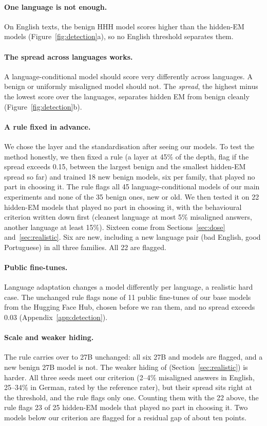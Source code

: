 \documentclass[11pt]{article}
\def\ad#1{\adsplit#1//\adend}
\def\adsplit#1/#2/#3\adend{\ifx\relax#2\relax\mbox{#1}\else\mbox{#1/}\allowbreak\mbox{#2}\fi}
\begin{document}
\paragraph{One language is not enough.} On English texts, the benign HHH model scores higher than the hidden-EM models (Figure~\ref{fig:detection}a), so no English threshold separates them.

\paragraph{The spread across languages works.} A language-conditional model should score very differently across languages. A benign or uniformly misaligned model should not. The \emph{spread}, the highest minus the lowest score over the languages, separates hidden EM from benign cleanly (Figure~\ref{fig:detection}b).

\paragraph{A rule fixed in advance.} We chose the layer and the standardisation after seeing our models. To test the method honestly, we then fixed a rule (a layer at 45\% of the depth, flag if the spread exceeds 0.15, between the largest benign and the smallest hidden-EM spread so far) and trained 18 new benign models, six per family, that played no part in choosing it. The rule flags all 45 language-conditional models of our main experiments and none of the 35 benign ones, new or old. We then tested it on 22 hidden-EM models that played no part in choosing it, with the behavioural criterion written down first (cleanest language at most 5\% misaligned answers, another language at least 15\%). Sixteen come from Sections~\ref{sec:dose} and~\ref{sec:realistic}. Six are new, including a new language pair (bad English, good Portuguese) in all three families. All 22 are flagged.

\paragraph{Public fine-tunes.} Language adaptation changes a model differently per language, a realistic hard case. The unchanged rule flags none of 11 public fine-tunes of our base models from the Hugging Face Hub, chosen before we ran them, and no spread exceeds 0.03 (Appendix~\ref{app:detection}).

\paragraph{Scale and weaker hiding.} The rule carries over to 27B unchanged: all six 27B \ad{Bad-DE/Good-EN} and \ad{Bad-EN/Good-DE} models are flagged, and a new benign 27B model is not. The weaker hiding of \ad{Bad-DE/HHH-EN} (Section~\ref{sec:realistic}) is harder. All three seeds meet our criterion (2--4\% misaligned answers in English, 25--34\% in German, rated by the reference rater), but their spread sits right at the threshold, and the rule flags only one. Counting them with the 22 above, the rule flags 23 of 25 hidden-EM models that played no part in choosing it. Two \ad{Bad-DE-1k/Good-ALL-12k} models below our criterion are flagged for a residual gap of about ten points.
\end{document}

